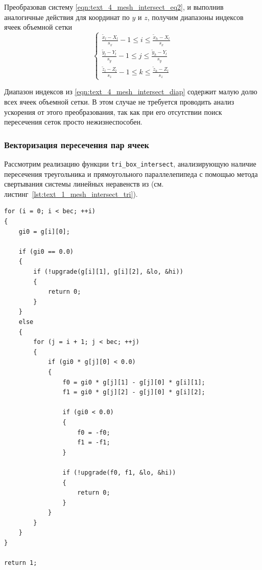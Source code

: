 Преобразовав систему \eqref{eqn:text_4_mesh_intersect_eq2}, и выполнив аналогичные действия для координат по $y$ и $z$, получим диапазоны индексов ячеек объемной сетки
\begin{equation}\label{eqn:text_4_mesh_intersect_diap}
	\left\{
		\begin{aligned}
			\frac{\tilde{x}_l - X_l}{s_x} - 1 \le i \le \frac{\tilde{x}_h - X_l}{s_x} \\
			\frac{\tilde{y}_l - Y_l}{s_y} - 1 \le j \le \frac{\tilde{y}_h - Y_l}{s_y} \\
			\frac{\tilde{z}_l - Z_l}{s_z} - 1 \le k \le \frac{\tilde{z}_h - Z_l}{s_z}
		\end{aligned}
	\right.
\end{equation}

Диапазон индексов из \eqref{eqn:text_4_mesh_intersect_diap} содержит малую долю всех ячеек объемной сетки.
В этом случае не требуется проводить анализ ускорения от этого преобразования, так как при его отсутствии поиск пересечения сеток просто нежизнеспособен.

\subsubsection{Векторизация пересечения пар ячеек}

Рассмотрим реализацию функции \texttt{tri\_box\_intersect}, анализирующую наличие пересечения треугольника и прямоугольного параллелепипеда с помощью метода свертывания системы линейных неравенств\label{term:method_svert_sys_neravenstv2} из \cite{Chernikov1963} (см. листинг~\ref{lst:text_1_mesh_intersect_tri}).

\begin{singlespace}
\begin{lstlisting}[caption={Исходная реализация свертывания системы линейных неравенств для определения пересечения треугольника и прямоугольного параллелепипеда.},label={lst:text_1_mesh_intersect_tri}]
for (i = 0; i < bec; ++i)
{
    gi0 = g[i][0];

    if (gi0 == 0.0)
    {
        if (!upgrade(g[i][1], g[i][2], &lo, &hi))
        {
            return 0;
        }
    }
    else
    {
        for (j = i + 1; j < bec; ++j)
        {
            if (gi0 * g[j][0] < 0.0)
            {
                f0 = gi0 * g[j][1] - g[j][0] * g[i][1];
                f1 = gi0 * g[j][2] - g[j][0] * g[i][2];

                if (gi0 < 0.0)
                {
                    f0 = -f0;
                    f1 = -f1;
                }

                if (!upgrade(f0, f1, &lo, &hi))
                {
                    return 0;
                }
            }
        }
    }
}

return 1;
\end{lstlisting}
\end{singlespace}

